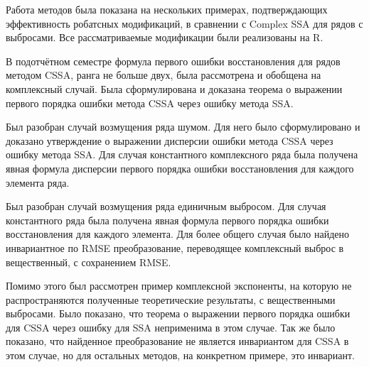 \documentclass[specialist,
               substylefile = spbu.rtx,
               subf,href,colorlinks=true, 12pt]{disser}
\begin{document}
Работа методов была показана на нескольких примерах, подтверждающих эффективность робатсных модификаций, в сравнении с Complex SSA для рядов с выбросами. Все рассматриваемые модификации были реализованы на R.

В подотчётном семестре формула первого ошибки восстановления для рядов методом CSSA, ранга не больше двух, была рассмотрена и обобщена на комплексный случай. Была сформулирована и доказана теорема о выражении первого порядка ошибки метода CSSA через ошибку метода SSA.

Был разобран случай возмущения ряда шумом. Для него было сформулировано и доказано утверждение о выражении дисперсии ошибки метода CSSA через ошибку метода SSA. Для случая константного комплексного ряда была получена явная формула дисперсии  первого порядка ошибки восстановления для каждого элемента ряда.

Был разобран случай возмущения ряда единичным выбросом. Для случая константного ряда была получена явная формула первого порядка ошибки восстановления для каждого элемента. Для более общего случая было найдено инвариантное по RMSE преобразование, переводящее комплексный выброс в вещественный, с сохранением RMSE.

Помимо этого был рассмотрен пример комплексной экспоненты, на которую не распространяются полученные теоретические результаты, с вещественными выбросами. Было показано, что теорема о выражении первого порядка ошибки для CSSA через ошибку для SSA неприменима в этом случае. Так же было показано, что найденное преобразование не является инвариантом для CSSA в этом случае, но для остальных методов, на конкретном примере, это инвариант.    

\nocite{*}

    
\end{document}

